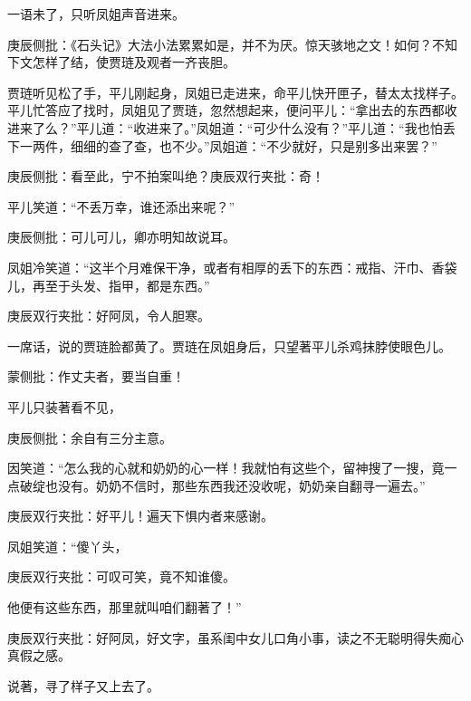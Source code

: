 \begin{parag}
    一语未了，只听凤姐声音进来。\begin{note}庚辰侧批：《石头记》大法小法累累如是，并不为厌。惊天骇地之文！如何？不知下文怎样了结，使贾琏及观者一齐丧胆。\end{note}贾琏听见松了手，平儿刚起身，凤姐已走进来，命平儿快开匣子，替太太找样子。平儿忙答应了找时，凤姐见了贾琏，忽然想起来，便问平儿：“拿出去的东西都收进来了么？”平儿道：“收进来了。”凤姐道：“可少什么没有？”平儿道：“我也怕丢下一两件，细细的查了查，也不少。”凤姐道：“不少就好，只是别多出来罢？”\begin{note}庚辰侧批：看至此，宁不拍案叫绝？庚辰双行夹批：奇！\end{note}平儿笑道：“不丢万幸，谁还添出来呢？”\begin{note}庚辰侧批：可儿可儿，卿亦明知故说耳。\end{note}凤姐冷笑道：“这半个月难保干净，或者有相厚的丢下的东西：戒指、汗巾、香袋儿，再至于头发、指甲，都是东西。”\begin{note}庚辰双行夹批：好阿凤，令人胆寒。\end{note}一席话，说的贾琏脸都黄了。贾琏在凤姐身后，只望著平儿杀鸡抹脖使眼色儿。\begin{note}蒙侧批：作丈夫者，要当自重！\end{note}平儿只装著看不见，\begin{note}庚辰侧批：余自有三分主意。\end{note}因笑道：“怎么我的心就和奶奶的心一样！我就怕有这些个，留神搜了一搜，竟一点破绽也没有。奶奶不信时，那些东西我还没收呢，奶奶亲自翻寻一遍去。”\begin{note}庚辰双行夹批：好平儿！遍天下惧内者来感谢。\end{note}凤姐笑道：“傻丫头，\begin{note}庚辰双行夹批：可叹可笑，竟不知谁傻。\end{note}他便有这些东西，那里就叫咱们翻著了！”\begin{note}庚辰双行夹批：好阿凤，好文字，虽系闺中女儿口角小事，读之不无聪明得失痴心真假之感。\end{note}说著，寻了样子又上去了。
\end{parag}


